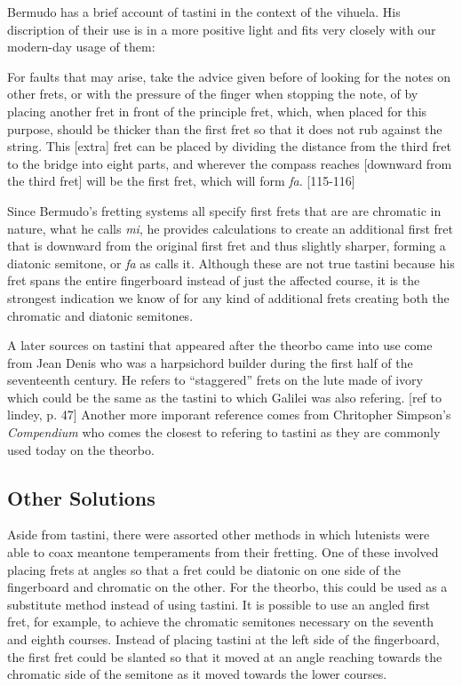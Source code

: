 Bermudo has a brief account of tastini in the context of the vihuela.  His discription
of their use is in a more positive light and fits very closely with our modern-day
usage of them:
\begin{blocks}
For faults that may arise, take the advice given before of looking for the notes on other
frets, or with the pressure of the finger when stopping the note, of by placing another
fret in front of the principle fret, which, when placed for this purpose, should be
thicker than the first fret so that it does not rub against the string. This [extra]
fret can be placed by dividing the distance from the third fret to the bridge into eight
parts, and wherever the compass reaches [downward from the third fret] will be the first
fret, which will form \textit{fa}. \autocite{DE:1}[115-116]
\end{blocks}
Since Bermudo's fretting systems all specify first frets that are are chromatic in nature,
what he calls \textit{mi}, he provides calculations to create an additional first fret
that is downward from the original first fret and thus slightly sharper, forming a
diatonic semitone, or \textit{fa} as calls it.  Although these are not true tastini
because his fret spans the entire fingerboard instead of just the affected course, it is
the strongest indication we know of for any kind of additional frets creating both the
chromatic and diatonic semitones.

A later sources on tastini that appeared after the theorbo came into use come from Jean
Denis who was a harpsichord builder during the first half of the seventeenth century. He
refers to ``staggered'' frets on the lute made of ivory which could be the same as the
tastini to which Galilei was also refering. [ref to lindey, p. 47]  Another more imporant
reference comes from Chritopher Simpson's \textit{Compendium} who comes the closest to
refering to tastini as they are commonly used today on the theorbo.


\subsection{Other Solutions}

Aside from tastini, there were assorted other methods in which lutenists were able to
coax meantone temperaments from their fretting.  One of these involved placing frets
at angles so that a fret could be diatonic on one side of the
fingerboard and chromatic on the other.  For the theorbo, this could be used as a
substitute method instead of using tastini.  It is possible to use an angled first fret,
for example, to achieve the chromatic semitones necessary on the seventh and eighth
courses.  Instead of placing tastini at the left side of the fingerboard, the first fret
could be slanted so that it moved at an angle reaching towards the chromatic side of the
semitone as it moved towards the lower courses.

